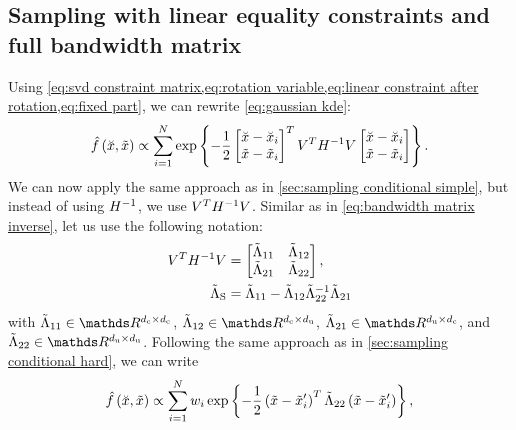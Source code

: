\subsection{Sampling with linear equality constraints and full bandwidth matrix}
\label{sec:sampling constrained hard}

Using \cref{eq:svd constraint matrix,eq:rotation variable,eq:linear constraint after rotation,eq:fixed part}, we can rewrite \cref{eq:gaussian kde}:
\begin{equation*}
	\hat{f}\left( \breve{x}, \tilde{x} \right) 
	\propto \sum_{i=1}^{N}
	\exp\left\{  -\frac{1}{2} 
		\begin{bmatrix} 
			\breve{x} - \breve{x}_{i} \\ 
			\tilde{x} - \tilde{x}_{i}
		\end{bmatrix}^T V^T H^{-1} V
		\begin{bmatrix} 
			\breve{x} - \breve{x}_{i} \\ 
			\tilde{x} - \tilde{x}_{i}
		\end{bmatrix}
	 \right\}.
\end{equation*}
We can now apply the same approach as in \cref{sec:sampling conditional simple}, but instead of using $H^{-1}$, we use $V^T H^{-1} V$.
Similar as in \cref{eq:bandwidth matrix inverse}, let us use the following notation:
\begin{align}
	V^T H^{-1} V 
	&= \begin{bmatrix} \tilde{\Lambda}_{11} & \tilde{\Lambda}_{12} \\ \tilde{\Lambda}_{21} & \tilde{\Lambda}_{22} \end{bmatrix}, \label{eq:rotated matrix inverse} \\
	\tilde{\Lambda}_{\mathrm{S}} &= \tilde{\Lambda}_{11} - \tilde{\Lambda}_{12} \tilde{\Lambda}_{22}^{-1} \tilde{\Lambda}_{21} \label{eq:rotated schur complement}
\end{align}
with $\bwriul \in \realnumbers^{\dimensionparta \times \dimensionparta}$, $\bwriur \in \realnumbers^{\dimensionparta \times \dimensionpartb}$, $\bwribl \in \realnumbers^{\dimensionpartb \times \dimensionparta}$, and $\bwribr \in \realnumbers^{\dimensionpartb \times \dimensionpartb}$. Following the same approach as in \cref{sec:sampling conditional hard}, we can write
\begin{equation*}
	\hat{f}\left( \breve{x}, \tilde{x} \right)
	\propto \sum_{i=1}^{N} w_{i}
	\exp\left\{  -\frac{1}{2} \left( \tilde{x} - \tilde{x}_{i}' \right)^T
		\tilde{\Lambda}_{22} \left( \tilde{x} - \tilde{x}_{i}' \right) \right\},
\end{equation*}
